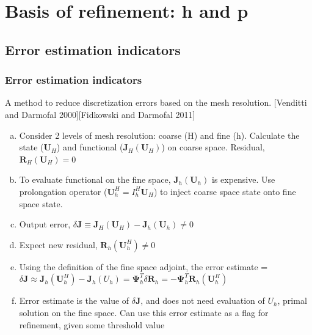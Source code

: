 \documentclass{beamer}
\begin{document}
\section[$\Psi$ with h]{Basis of refinement: h and p}

\subsection[Estimation]{Error estimation indicators}
\begin{frame}
\scriptsize
\frametitle{Error estimation indicators}

A method to reduce discretization errors based on the mesh resolution.
\tiny{[Venditti and Darmofal 2000][Fidkowski and Darmofal 2011]}
\begin{enumerate}[(a)]
\scriptsize
\item Consider 2 levels of mesh resolution: coarse (H) and fine (h). Calculate the state ($\mathbf{U}_H$) and functional ($\mathbf{J}_H(\mathbf{U}_H)$) on coarse space. Residual, $\mathbf{R}_H(\mathbf{U}_H) = 0$
\item To evaluate functional on the fine space, $\mathbf{J}_h(\mathbf{U}_h)$ is expensive. Use prolongation operator ($\mathbf{U}_h^H = I_h^H \mathbf{U}_H$) to inject coarse space state onto fine space state.
\item Output error, $\delta \mathbf{J} \equiv \mathbf{J}_H(\mathbf{U}_H) - \mathbf{J}_h(\mathbf{U}_h) \neq 0$
\item Expect new residual, $\mathbf{R}_h(\mathbf{U}_h^H) \neq 0$ 
\item Using the definition of the fine space adjoint, the error estimate = $ \delta \mathbf{J} \approx  \mathbf{J}_h(\mathbf{U}_h^H) - \mathbf{J}_h(U_h) = \mathbf{\Psi}_h^T \delta \mathbf{R}_h = -\mathbf{\Psi}_h^T \mathbf{R}_h(\mathbf{U}_h^H)   $
\item Error estimate is the value of $\delta \mathbf{J}$, and does not need evaluation of $U_h$, primal solution on the fine space. Can use this error estimate as a flag for refinement, given some threshold value
\end{enumerate}

\end{frame}
\end{document}
